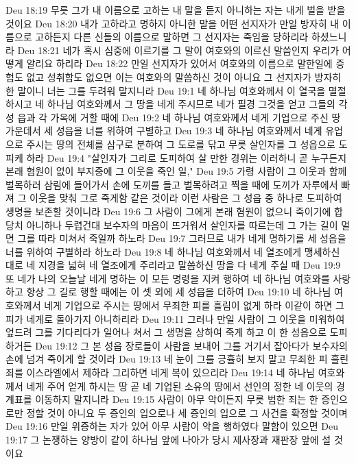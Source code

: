 Deu 18:19  무릇 그가 내 이름으로 고하는 내 말을 듣지 아니하는 자는 내게 벌을 받을 것이요
Deu 18:20  내가 고하라고 명하지 아니한 말을 어떤 선지자가 만일 방자히 내 이름으로 고하든지 다른 신들의 이름으로 말하면 그 선지자는 죽임을 당하리라 하셨느니라
Deu 18:21  네가 혹시 심중에 이르기를 그 말이 여호와의 이르신 말씀인지 우리가 어떻게 알리요 하리라
Deu 18:22  만일 선지자가 있어서 여호와의 이름으로 말한일에 증험도 없고 성취함도 없으면 이는 여호와의 말씀하신 것이 아니요 그 선지자가 방자히 한 말이니 너는 그를 두려워 말지니라
Deu 19:1  네 하나님 여호와께서 이 열국을 멸절하시고 네 하나님 여호와께서 그 땅을 네게 주시므로 네가 필경 그것을 얻고 그들의 각 성 읍과 각 가옥에 거할 때에
Deu 19:2  네 하나님 여호와께서 네게 기업으로 주신 땅 가운데서 세 성읍을 너를 위하여 구별하고
Deu 19:3  네 하나님 여호와께서 네게 유업으로 주시는 땅의 전체를 삼구로 분하여 그 도로를 닦고 무릇 살인자를 그 성읍으로 도피케 하라
Deu 19:4  "살인자가 그리로 도피하여 살 만한 경위는 이러하니 곧 누구든지 본래 혐원이 없이 부지중에 그 이웃을 죽인 일,"
Deu 19:5  가령 사람이 그 이웃과 함께 벌목하러 삼림에 들어가서 손에 도끼를 들고 벌목하려고 찍을 때에 도끼가 자루에서 빠져 그 이웃을 맞춰 그로 죽게함 같은 것이라 이런 사람은 그 성읍 중 하나로 도피하여 생명을 보존할 것이니라
Deu 19:6  그 사람이 그에게 본래 혐원이 없으니 죽이기에 합당치 아니하나 두렵건대 보수자의 마음이 뜨거워서 살인자를 따르는데 그 가는 길이 멀면 그를 따라 미쳐서 죽일까 하노라
Deu 19:7  그러므로 내가 네게 명하기를 세 성읍을 너를 위하여 구별하라 하노라
Deu 19:8  네 하나님 여호와께서 네 열조에게 맹세하신 대로 네 지경을 넓혀 네 열조에게 주리라고 말씀하신 땅을 다 네게 주실 때
Deu 19:9  또 네가 나의 오늘날 네게 명하는 이 모든 명령을 지켜 행하여 네 하나님 여호와를 사랑하고 항상 그 길로 행할 때에는 이 셋 외에 세 성읍을 더하여
Deu 19:10  네 하나님 여호와께서 네게 기업으로 주시는 땅에서 무죄한 피를 흘림이 없게 하라 이같이 하면 그 피가 네게로 돌아가지 아니하리라
Deu 19:11  그러나 만일 사람이 그 이웃을 미워하여 엎드려 그를 기다리다가 일어나 쳐서 그 생명을 상하여 죽게 하고 이 한 성읍으로 도피 하거든
Deu 19:12  그 본 성읍 장로들이 사람을 보내어 그를 거기서 잡아다가 보수자의 손에 넘겨 죽이게 할 것이라
Deu 19:13  네 눈이 그를 긍휼히 보지 말고 무죄한 피 흘린 죄를 이스라엘에서 제하라 그리하면 네게 복이 있으리라
Deu 19:14  네 하나님 여호와께서 네게 주어 얻게 하시는 땅 곧 네 기업된 소유의 땅에서 선인의 정한 네 이웃의 경계표를 이동하지 말지니라
Deu 19:15  사람이 아무 악이든지 무릇 범한 죄는 한 증인으로만 정할 것이 아니요 두 증인의 입으로나 세 증인의 입으로 그 사건을 확정할 것이며
Deu 19:16  만일 위증하는 자가 있어 아무 사람이 악을 행하였다 말함이 있으면
Deu 19:17  그 논쟁하는 양방이 같이 하나님 앞에 나아가 당시 제사장과 재판장 앞에 설 것이요

